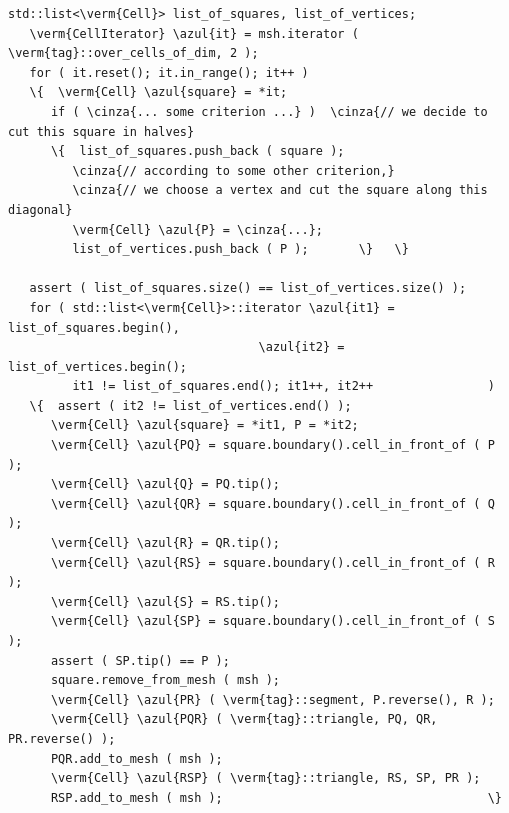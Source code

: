 \begin{Verbatim}[commandchars=\\\{\},formatcom=\small\tt,frame=single,
   label=main-\ref{\numb section 10.\numb parag 3}.cpp,rulecolor=\color{coment},
   baselinestretch=0.94,framesep=2mm]
   std::list<\verm{Cell}> list_of_squares, list_of_vertices;
   \verm{CellIterator} \azul{it} = msh.iterator ( \verm{tag}::over_cells_of_dim, 2 );
   for ( it.reset(); it.in_range(); it++ )
   \{  \verm{Cell} \azul{square} = *it;
      if ( \cinza{... some criterion ...} )  \cinza{// we decide to cut this square in halves}
      \{  list_of_squares.push_back ( square );
         \cinza{// according to some other criterion,}
         \cinza{// we choose a vertex and cut the square along this diagonal}
         \verm{Cell} \azul{P} = \cinza{...};  
         list_of_vertices.push_back ( P );       \}   \}

   assert ( list_of_squares.size() == list_of_vertices.size() );
   for ( std::list<\verm{Cell}>::iterator \azul{it1} = list_of_squares.begin(),
                                   \azul{it2} = list_of_vertices.begin();
         it1 != list_of_squares.end(); it1++, it2++                )
   \{  assert ( it2 != list_of_vertices.end() );
      \verm{Cell} \azul{square} = *it1, P = *it2;
      \verm{Cell} \azul{PQ} = square.boundary().cell_in_front_of ( P );
      \verm{Cell} \azul{Q} = PQ.tip();
      \verm{Cell} \azul{QR} = square.boundary().cell_in_front_of ( Q );
      \verm{Cell} \azul{R} = QR.tip();
      \verm{Cell} \azul{RS} = square.boundary().cell_in_front_of ( R );
      \verm{Cell} \azul{S} = RS.tip();
      \verm{Cell} \azul{SP} = square.boundary().cell_in_front_of ( S );
      assert ( SP.tip() == P );
      square.remove_from_mesh ( msh );
      \verm{Cell} \azul{PR} ( \verm{tag}::segment, P.reverse(), R );
      \verm{Cell} \azul{PQR} ( \verm{tag}::triangle, PQ, QR, PR.reverse() );
      PQR.add_to_mesh ( msh );
      \verm{Cell} \azul{RSP} ( \verm{tag}::triangle, RS, SP, PR );
      RSP.add_to_mesh ( msh );                                     \}
\end{Verbatim}
